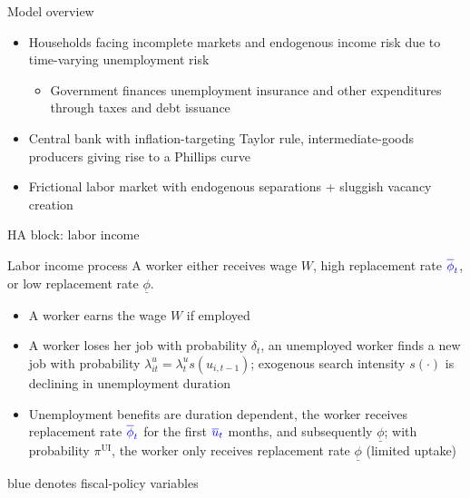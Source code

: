 \documentclass[aspectratio=169]{beamer}
\begin{document}
\begin{frame}{Model overview}
    \begin{itemize}
        \item[HA] Households facing incomplete markets and endogenous income risk due to time-varying unemployment risk
        \begin{itemize}
            \item Government finances unemployment insurance and other expenditures through taxes and debt issuance
        \end{itemize}
        \item[NK]  Central bank with inflation-targeting Taylor rule, intermediate-goods producers giving rise to a Phillips curve
        \item[SAM] Frictional labor market with endogenous separations + sluggish vacancy creation
    \end{itemize}
\end{frame}

\begin{frame}{HA block: labor income}

\begin{block}{Labor income process}
A worker either receives wage $W$, high replacement rate $\color{blue}\overline{\phi}_t$, or low replacement rate $\underline{\phi}$. 
\begin{itemize}
	\item[Wage] A worker earns the wage $W$ if employed
	\item[SAM] A worker loses her job with probability $\delta_t$, an unemployed worker finds a new job with probability $\lambda_{it}^{u}=\lambda^u_t s(u_{i,t-1})$; exogenous search intensity $s(\cdot)$ is declining in unemployment duration
	\item[UI] Unemployment benefits are duration dependent, the worker receives replacement rate $\color{blue}\overline{\phi}_t$ for the first $\color{blue}\overline{u}_t$ months, and subsequently $\underline{\phi}$; with probability $\pi^\text{UI}$, the worker only receives replacement rate $\underline{\phi}$ (limited uptake)
\end{itemize}

\end{block}
\bigskip
\footnotesize {\color{blue} blue} denotes fiscal-policy variables
\end{frame}
\end{document}
